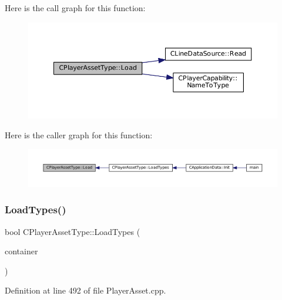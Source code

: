 Here is the call graph for this function\+:\nopagebreak
\begin{figure}[H]
\begin{center}
\leavevmode
\includegraphics[width=350pt]{classCPlayerAssetType_a8e50738b1b451f4c870108777e6e3f90_cgraph}
\end{center}
\end{figure}
Here is the caller graph for this function\+:\nopagebreak
\begin{figure}[H]
\begin{center}
\leavevmode
\includegraphics[width=350pt]{classCPlayerAssetType_a8e50738b1b451f4c870108777e6e3f90_icgraph}
\end{center}
\end{figure}
\hypertarget{classCPlayerAssetType_ad36348338ae4fea7e70450ef30c92a26}{}\label{classCPlayerAssetType_ad36348338ae4fea7e70450ef30c92a26} 
\subsubsection{\texorpdfstring{Load\+Types()}{LoadTypes()}}
{\footnotesize\ttfamily bool C\+Player\+Asset\+Type\+::\+Load\+Types (\begin{DoxyParamCaption}\item[{std\+::shared\+\_\+ptr$<$ \hyperlink{classCDataSourceContainer}{C\+Data\+Source\+Container} $>$}]{container }\end{DoxyParamCaption})\hspace{0.3cm}{\ttfamily [static]}}



Definition at line 492 of file Player\+Asset.\+cpp.


